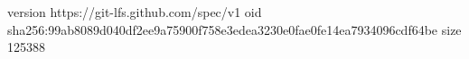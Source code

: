 version https://git-lfs.github.com/spec/v1
oid sha256:99ab8089d040df2ee9a75900f758e3edea3230e0fae0fe14ea7934096cdf64be
size 125388
